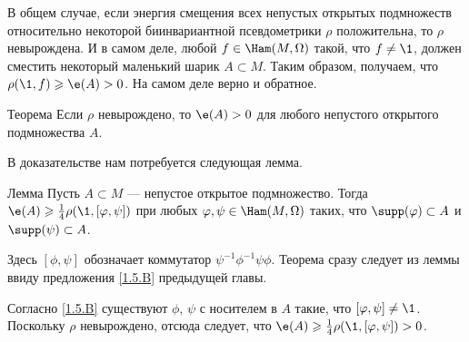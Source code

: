 В общем случае, если энергия смещения всех непустых открытых подмножеств относительно некоторой биинвариантной псевдометрики $\rho$ положительна, то $\rho$ невырождена.
И в самом деле, любой $f \in \Ham (M, \Omega)$ такой, что $f \ne \1$,
должен сместить некоторый маленький шарик $A \subset M$.
Таким образом, получаем, что $\rho (\1, f) \ge \e (A)> 0$.
На самом деле верно и обратное.

\begin{thm}[(\cite{EP})]{Теорема}\label{2.4.A}
Если $\rho$ невырождено, то $\e (A)> 0$ для любого непустого открытого подмножества $A$.
\end{thm}

В доказательстве нам потребуется следующая лемма.

\begin{thm}{Лемма}\label{2.4.B}
Пусть $A \subset M$ --- непустое открытое подмножество.
Тогда $\e (A) \ge \tfrac14 \rho (\1, [\phi, \psi])$ при любых $\phi, \psi \in \Ham (M, \Omega)$ таких, что $\supp (\phi) \subset A$ и $\supp (\psi) \subset A$.
\end{thm}

Здесь $[\phi, \psi]$ обозначает коммутатор $\psi^{-1} \phi^{-1} \psi\phi$.
Теорема сразу следует из леммы ввиду предложения \ref{1.5.B} предыдущей главы.

Согласно \ref{1.5.B} существуют $\phi$, $\psi$ с носителем в $A$ такие, что $[\phi, \psi] \ne \1$.
Поскольку $\rho$ невырождено, отсюда следует, что $\e (A) \ge \tfrac14 \rho (\1, [\phi, \psi])> 0$.
\qeds

